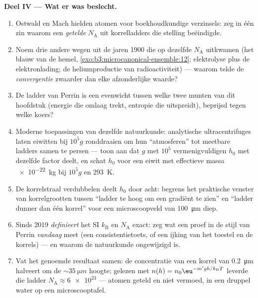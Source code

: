 \begin{problem}
\medskip\noindent\textbf{Deel IV --- Wat er was beslecht.}
\begin{enumerate}[resume]
  \item Ostwald en Mach hielden atomen voor boekhoudkundige verzinsels:
        zeg in één zin waarom een \emph{getelde} $N_{\text{A}}$ uit
        korrelladders die stelling beëindigde.
  \item Noem drie andere wegen uit de jaren 1900 die op dezelfde
        $N_{\text{A}}$ uitkwamen (het blauw van de hemel,
        \cref{exo:b3:microcanonical-ensemble:12}; elektrolyse plus de
        elektronlading; de heliumproductie van radioactiviteit) --- waarom
        telde de \emph{convergentie} zwaarder dan elke afzonderlijke
        waarde?
  \item De ladder van Perrin is een evenwicht tussen welke twee munten van
        dit hoofdstuk (energie die omlaag trekt, entropie die uitspreidt),
        beprijsd tegen welke koers?
  \item Moderne toepassingen van dezelfde natuurkunde: analytische
        ultracentrifuges laten eiwitten bij $10^5g$ ronddraaien om hun
        ``atmosferen'' tot meetbare ladders samen te persen --- toon aan dat
        $g$ met $10^5$ vermenigvuldigen $h_0$ met dezelfde factor deelt, en
        schat $h_0$ voor een eiwit met effectieve massa \qty{e-22}{kg} bij
        $10^5g$ en \qty{293}{K}.
  \item De korrelstraal verdubbelen deelt $h_0$ door acht: begrens het
        praktische venster van korrelgrootten tussen ``ladder te hoog om
        een gradiënt te zien'' en ``ladder dunner dan één korrel'' voor een
        microscoopveld van \qty{100}{\micro m} diep.
  \item Sinds 2019 \emph{definieert} het SI $k_{\text{B}}$ en
        $N_{\text{A}}$ exact: zeg wat een proef in de stijl van Perrin
        \emph{vandaag} meet (een consistentietoets, of een ijking van het
        toestel en de korrels) --- en waarom de natuurkunde ongewijzigd is.
  \item Vat het genoemde resultaat samen: de concentratie van een korrel
        van \qty{0.2}{\micro m} halveert om de $\sim\qty{35}{\micro m}$
        hoogte; gelezen met $n(h) = n_0\eu^{-m'gh/k_{\text{B}}T}$ leverde
        die ladder $N_{\text{A}} \approx \num{6e23}$ --- atomen geteld en
        niet vermoed, in een druppel water op een microscooptafel.
\end{enumerate}
\end{problem}
